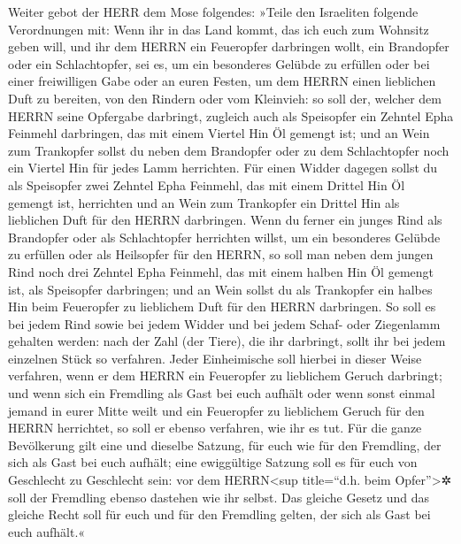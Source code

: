Weiter gebot der HERR dem Mose folgendes:
»Teile den Israeliten folgende Verordnungen mit: Wenn ihr
in das Land kommt, das ich euch zum Wohnsitz geben will,
und ihr dem HERRN ein Feueropfer darbringen wollt, ein
Brandopfer oder ein Schlachtopfer, sei es, um ein besonderes Gelübde zu
erfüllen oder bei einer freiwilligen Gabe oder an euren Festen, um dem
HERRN einen lieblichen Duft zu bereiten, von den Rindern oder vom
Kleinvieh: so soll der, welcher dem HERRN seine Opfergabe
darbringt, zugleich auch als Speisopfer ein Zehntel Epha Feinmehl
darbringen, das mit einem Viertel Hin Öl gemengt ist; und
an Wein zum Trankopfer sollst du neben dem Brandopfer oder zu dem
Schlachtopfer noch ein Viertel Hin für jedes Lamm herrichten.
Für einen Widder dagegen sollst du als Speisopfer zwei
Zehntel Epha Feinmehl, das mit einem Drittel Hin Öl gemengt ist,
herrichten und an Wein zum Trankopfer ein Drittel Hin als
lieblichen Duft für den HERRN darbringen. Wenn du ferner
ein junges Rind als Brandopfer oder als Schlachtopfer herrichten willst,
um ein besonderes Gelübde zu erfüllen oder als Heilsopfer für den HERRN,
so soll man neben dem jungen Rind noch drei Zehntel Epha
Feinmehl, das mit einem halben Hin Öl gemengt ist, als Speisopfer
darbringen; und an Wein sollst du als Trankopfer ein
halbes Hin beim Feueropfer zu lieblichem Duft für den HERRN darbringen.
So soll es bei jedem Rind sowie bei jedem Widder und bei
jedem Schaf- oder Ziegenlamm gehalten werden: nach der
Zahl (der Tiere), die ihr darbringt, sollt ihr bei jedem einzelnen Stück
so verfahren. Jeder Einheimische soll hierbei in dieser
Weise verfahren, wenn er dem HERRN ein Feueropfer zu lieblichem Geruch
darbringt; und wenn sich ein Fremdling als Gast bei euch
aufhält oder wenn sonst einmal jemand in eurer Mitte weilt und ein
Feueropfer zu lieblichem Geruch für den HERRN herrichtet, so soll er
ebenso verfahren, wie ihr es tut. Für die ganze
Bevölkerung gilt eine und dieselbe Satzung, für euch wie für den
Fremdling, der sich als Gast bei euch aufhält; eine ewiggültige Satzung
soll es für euch von Geschlecht zu Geschlecht sein: vor dem
HERRN\textless sup title=``d.h. beim Opfer''\textgreater✲ soll der
Fremdling ebenso dastehen wie ihr selbst. Das gleiche
Gesetz und das gleiche Recht soll für euch und für den Fremdling gelten,
der sich als Gast bei euch aufhält.«

